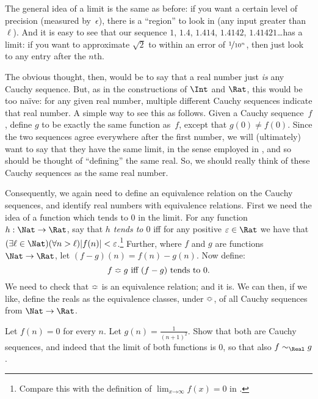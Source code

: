 \documentclass[../../../include/open-logic-section]{subfiles}
\begin{document}
The general idea of a limit is the same as before: if you want a
certain level of precision (measured by~$\epsilon$), there is a
``region'' to look in (any input greater than~$\ell$). And it is easy
to see that our sequence $1$, $1.4$, $1.414$, $1.4142$,
$1.41421$\ldots has a limit: if you want to approximate $\sqrt{2}$ to
within an error of $\nicefrac{1}{10^{n}}$, then just look to any entry
after the $n$th.

The obvious thought, then, would be to say that a real number just
\emph{is} any Cauchy sequence. But, as in the constructions of $\Int$
and $\Rat$, this would be too na\"{i}ve: for any given real number,
multiple different Cauchy sequences indicate that real number. A
simple way to see this as follows. Given a Cauchy sequence~$f$, define
$g$ to be exactly the same function as~$f$, except that $g(0)\neq
f(0)$. Since the two sequences agree everywhere after the first
number, we will (ultimately) want to say that they have the same
limit, in the sense employed in ,
and so should be thought of ``defining'' the same real. So, we should
really think of these Cauchy sequences as the same real number.

Consequently, we again need to define an equivalence relation on the
Cauchy sequences, and identify real numbers with equivalence
relations. First we need the idea of a function which tends to $0$ in
the limit. For any function $h : \Nat \to \Rat$, say that \emph{$h$
tends to $0$} iff for any positive $\epsilon \in \Rat$ we have that
$(\exists \ell \in \Nat)(\forall n > \ell)|f(n)| <
\epsilon$.\footnote{Compare this with the definition of $\lim_{x
\mathord{\rightarrow}\infty}f(x) = 0$ in
.} Further, where $f$ and $g$ are
functions $\Nat \to \Rat$, let $(f-g)(n) = f(n) - g(n)$. Now define:
\[
	f \Bumpeq g \text{ iff $(f-g)$ tends to $0$}.
\]
We need to check that $\Bumpeq$ is an equivalence relation; and it
is. We can then, if we like, define the reals as the equivalence
classes, under $\Bumpeq$, of all Cauchy sequences from $\Nat \to
\Rat$.

\begin{prob}
Let $f(n) = 0$ for every $n$. Let $g(n) = \frac{1}{(n+1)^2}$. Show
that both are Cauchy sequences, and indeed that the limit of both
functions is $0$, so that also $f \sim_\Real g$. 
\end{prob}
\end{document}
